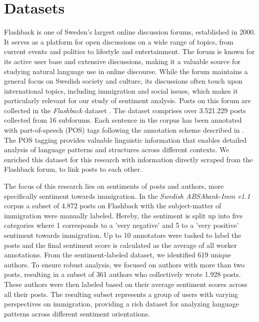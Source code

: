 \documentclass[11pt]{article}
\begin{document}
\section{Datasets}
Flashback is one of Sweden's largest online discussion forums, established in 2000.
It serves as a platform for open discussions on a wide range of topics, from current events and politics to lifestyle and entertainment.
The forum is known for its active user base and extensive discussions, making it a valuable source for studying natural language use in online discourse.
While the forum maintains a general focus on Swedish society and culture, its discussions often touch upon international topics, including immigration and social issues, which makes it particularly relevant for our study of sentiment analysis.
Posts on this forum are collected in the \emph{Flashback} dataset \citep{Spraakbanken2025}.
The dataset comprises over 3.521.229 posts collected from 16 subforums.
Each sentence in the corpus has been annotated with part-of-speech (POS) tags following the annotation scheme described in \citep{Spraakbanken2024}.
The POS tagging provides valuable linguistic information that enables detailed analysis of language patterns and structures across different contexts.
We enriched this dataset for this research with information directly scraped from the Flashback forum, to link posts to each other.

The focus of this research lies on sentiments of posts and authors, more specifically sentiment towards immigration.
In the \emph{Swedish ABSAbank-Imm v1.1 } corpus \citep{Berdicevskis2023} a subset of 4.872 posts on Flashback with the subject-matter of immigration were manually labeled.
Hereby, the sentiment is split up into five categories where 1 corresponds to a 'very negative' and 5 to a 'very positive' sentiment towards immigration.
Up to 10 annotators were tasked to label the posts and the final sentiment score is calculated as the average of all worker annotations.
From the sentiment-labeled dataset, we identified 619 unique authors.
To ensure robust analysis, we focused on authors with more than two posts, resulting in a subset of 361 authors who collectively wrote 1.928 posts.
These authors were then labeled based on their average sentiment scores across all their posts.
The resulting subset represents a group of users with varying perspectives on immigration, providing a rich dataset for analyzing language patterns across different sentiment orientations.
\end{document}
